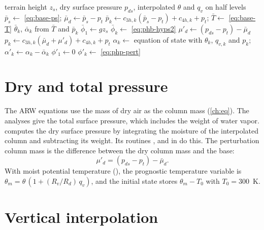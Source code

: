 \begin{algorithm}[ht]
\caption{Building the dry hydrostatic column in  (one horizontal point).}
\label{alg:column}
\begin{algorithmic}[1]
\Require terrain height $z_s$, dry surface pressure $p_{ds}$, interpolated $\theta$ and $q_v$ on half levels
\State $\bar p_s \gets$ \cref{eq:base-ps}; \quad $\bar\mu_d \gets \bar p_s - p_t$
  \State $\bar p_k \gets c_{3h,k}(\bar p_s - p_t) + c_{4h,k} + p_t$; \quad $\bar T \gets$ \cref{eq:base-T}
  \State $\bar\theta_k$, $\bar\alpha_k$ from $\bar T$ and $\bar p_k$
\EndFor
\State $\bar\phi_1 \gets g z_s$
 
  \State $\bar\phi_k \gets$ \cref{eq:phb-hyps2}
\EndFor
\State $\mu'_d \gets (p_{ds} - p_t) - \bar\mu_d$
  \State $p_k \gets c_{3h,k}(\bar\mu_d + \mu'_d) + c_{4h,k} + p_t$ 
  \State $\alpha_k \gets$ equation of state with $\theta_k$, $q_{v,k}$ and $p_k$; \quad $\alpha'_k \gets \alpha_k - \bar\alpha_k$
\EndFor
\State $\phi'_1 \gets 0$
  \State $\phi'_k \gets$ \cref{eq:php-pert}
\EndFor
\end{algorithmic}
\end{algorithm}

\section{Dry and total pressure}

The ARW equations use the mass of dry air as the column mass (\cref{ch:eq}). The analyses give the total surface
pressure, which includes the weight of water vapor.  computes the dry surface pressure by integrating
the moisture of the interpolated column and subtracting its weight. Its routines ,
 and  in  do this. The perturbation column mass is the
difference between the dry column mass and the base:
\begin{equation}
  \mu'_d = (p_{ds} - p_t) - \bar\mu_d .
\end{equation}
With moist potential temperature (), the prognostic temperature variable is
$\theta_m = \theta\,(1 + (R_v/R_d)\,q_v)$, and the initial state stores $\theta_m - T_0$ with $T_0 = 300$~K.

\section{Vertical interpolation}


